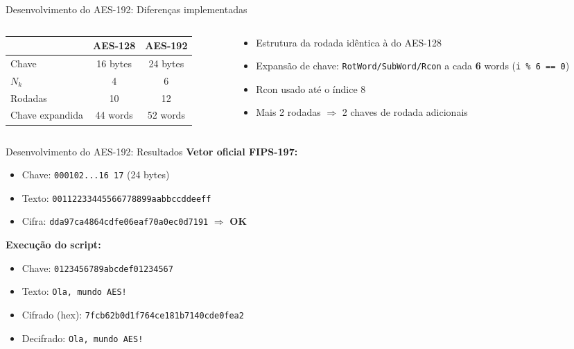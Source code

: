 \documentclass[aspectratio=169,11pt]{beamer}
\begin{document}
\begin{frame}{Desenvolvimento do AES-192: Diferenças implementadas}
  \small
  \begin{columns}[T]
    \begin{column}{0.5\textwidth}
      \begin{tabular}{lcc}
        \toprule
        & \textbf{AES-128} & \textbf{AES-192}\\
        \midrule
        Chave & 16 bytes & 24 bytes\\
        $N_k$ & 4 & 6\\
        Rodadas & 10 & 12\\
        Chave expandida & 44 words & 52 words\\
        \bottomrule
      \end{tabular}
    \end{column}
    \begin{column}{0.5\textwidth}
      \begin{itemize}
        \item Estrutura da rodada idêntica à do AES-128
        \item Expansão de chave: \texttt{RotWord/SubWord/Rcon} a cada \textbf{6} words
          (\texttt{i \% 6 == 0})
        \item Rcon usado até o índice 8
        \item Mais 2 rodadas $\Rightarrow$ 2 chaves de rodada adicionais
      \end{itemize}
    \end{column}
  \end{columns}
\end{frame}

\begin{frame}{Desenvolvimento do AES-192: Resultados}
  \small
  \textbf{Vetor oficial FIPS-197:}
  \begin{itemize}
    \item Chave: \texttt{000102...16 17} (24 bytes)
    \item Texto: \texttt{00112233445566778899aabbccddeeff}
    \item Cifra: \texttt{dda97ca4864cdfe06eaf70a0ec0d7191} \hfill $\Rightarrow$ \textbf{OK}
  \end{itemize}

  \vspace{0.5em}
  \textbf{Execução do script:}
  \begin{itemize}
    \item Chave: \texttt{0123456789abcdef01234567}
    \item Texto: \texttt{Ola, mundo AES!}
    \item Cifrado (hex): \texttt{7fcb62b0d1f764ce181b7140cde0fea2}
    \item Decifrado: \texttt{Ola, mundo AES!}
  \end{itemize}
\end{frame}
\end{document}

